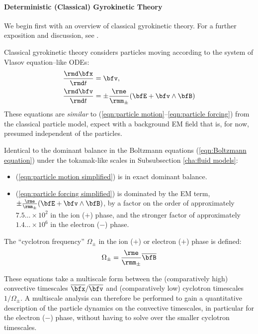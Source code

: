 \paragraph*{Deterministic (Classical) Gyrokinetic Theory}
    We begin first with an overview of classical gyrokinetic theory. For a further exposition and discussion, see \cite{Woods_2006, Freidberg_2008, Chen_2015}.

    Classical gyrokinetic theory considers particles moving according to the system of Vlasov equation--like ODEs:
    \begin{align}
        \frac{\rmd\bfx}{\rmd t}  &=  \bfv,  \label{eqn:particle motion simplified}  \\
        \frac{\rmd\bfv}{\rmd t}  &=  \pm\frac{\rme}{\rmm_{\pm}}(\bfE + \bfv\wedge\bfB)  \label{eqn:particle forcing simplified}
    \end{align}
    These equations are \emph{similar} to (\ref{eqn:particle motion}--\ref{eqn:particle forcing}) from the classical particle model, expect with a background EM field that is, for now, presumed independent of the particles.
    
    Identical to the dominant balance in the Boltzmann equations (\ref{eqn:Boltzmann equation}) under the tokamak-like scales in Subsubsection \ref{cha:fluid models}:
    \begin{itemize}
        \item  (\ref{eqn:particle motion simplified}) is in exact dominant balance.
        \item  (\ref{eqn:particle forcing simplified}) is dominated by the EM term, $\pm\frac{\rme}{\rmm_{\pm}}(\bfE + \bfv\wedge\bfB)$, by a factor on the order of approximately $7.5\ldots\times 10^{2}$ in the ion ($+$) phase, and the stronger factor of approximately $1.4\ldots\times 10^{6}$ in the electron ($-$) phase. 
    \end{itemize}

    \begin{definition}
        The ``cyclotron frequency'' $\Omega_{\pm}$ in the ion ($+$) or electron ($+$) phase is defined: 
        \begin{equation}
            \Omega_{\pm}  =  \frac{\rme}{\rmm_{\pm}}\overline{\bfB}
        \end{equation}
    \end{definition}
    
    These equations take a multiscale form between the (comparatively high) convective timescales $\overline{\bfx}/\overline{\bfv}$ and (comparatively low) cyclotron timescales $1/\Omega_{\pm}$. A multiscale analysis \cite{Kevorkin_Cole_2012} can therefore be performed to gain a quantitative description of the particle dynamics on the convective timescales, in particular for the electron ($-$) phase, without having to solve over the smaller cyclotron timescales.

